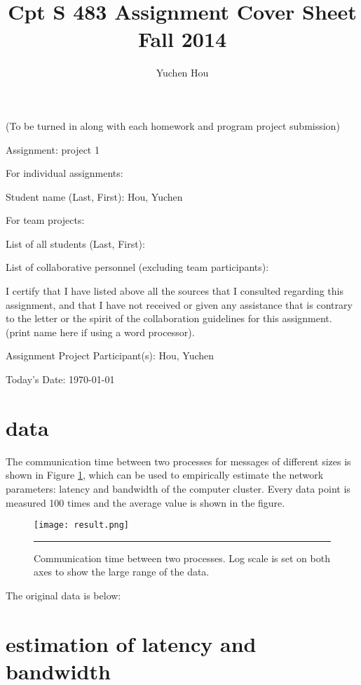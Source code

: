 \documentclass[12pt]{article}
\begin{document}
\title{Cpt S 483 Assignment Cover Sheet \\ Fall 2014
}
\author{Yuchen Hou}
\maketitle

(To be turned in along with each homework and program project submission)

Assignment: project 1

For individual assignments:

Student name (Last, First): Hou, Yuchen

For team projects:

List of all students (Last, First):

List of collaborative personnel (excluding team participants):

I certify that I have listed above all the sources that I consulted regarding this assignment, and that I have not received or given any assistance that is contrary to the letter or the spirit of the collaboration guidelines for this assignment. (print name here if using a word processor).

Assignment Project Participant(s): Hou, Yuchen

Today's Date: \today

\pagebreak

\section{data}

The communication time between two processes for messages of different sizes is shown in Figure \ref{fig:result}, which can be used to empirically estimate the network parameters: latency and bandwidth of the computer cluster. Every data point is measured 100 times and the average value is shown in the figure.
\begin{figure}[htb]
  \centering
      {\texttt{[image: result.png]}} \rule{1\linewidth}{1pt}
      \caption{Communication time between two processes. Log scale is set on both axes to show the large range of the data.}
      \label{fig:result}
\end{figure}
The original data is below:

\section{estimation of latency and bandwidth}
\end{document}
